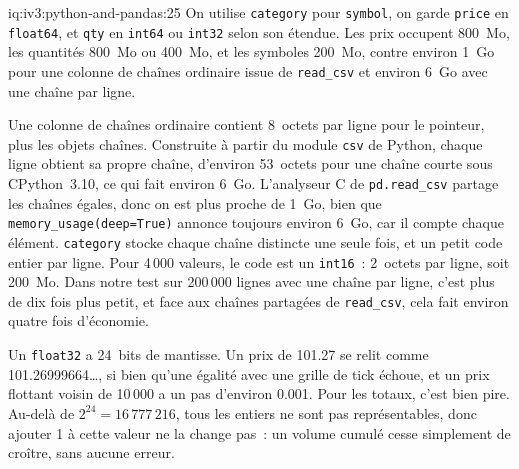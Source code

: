 \begin{solution}{iq:iv3:python-and-pandas:25}
On utilise \texttt{category} pour \texttt{symbol}, on garde \texttt{price} en \texttt{float64}, et \texttt{qty} en \texttt{int64} ou \texttt{int32} selon son étendue. Les prix occupent 800~Mo, les quantités 800~Mo ou 400~Mo, et les symboles 200~Mo, contre environ 1~Go pour une colonne de chaînes ordinaire issue de \texttt{read\_csv} et environ 6~Go avec une chaîne par ligne.

Une colonne de chaînes ordinaire contient 8~octets par ligne pour le pointeur, plus les objets chaînes. Construite à partir du module \texttt{csv} de Python, chaque ligne obtient sa propre chaîne, d'environ 53~octets pour une chaîne courte sous CPython~3.10, ce qui fait environ 6~Go. L'analyseur C de \texttt{pd.read\_csv} partage les chaînes égales, donc on est plus proche de 1~Go, bien que \texttt{memory\_usage(deep=True)} annonce toujours environ 6~Go, car il compte chaque élément. \texttt{category} stocke chaque chaîne distincte une seule fois, et un petit code entier par ligne. Pour 4\,000 valeurs, le code est un \texttt{int16}~: 2~octets par ligne, soit 200~Mo. Dans notre test sur 200\,000 lignes avec une chaîne par ligne, c'est plus de dix fois plus petit, et face aux chaînes partagées de \texttt{read\_csv}, cela fait environ quatre fois d'économie.

Un \texttt{float32} a 24~bits de mantisse. Un prix de 101.27 se relit comme 101.26999664\dots, si bien qu'une égalité avec une grille de tick échoue, et un prix flottant voisin de 10\,000 a un pas d'environ 0.001. Pour les totaux, c'est bien pire. Au-delà de $2^{24} = 16\,777\,216$, tous les entiers ne sont pas représentables, donc ajouter 1 à cette valeur ne la change pas~: un volume cumulé cesse simplement de croître, sans aucune erreur.

\end{solution}

